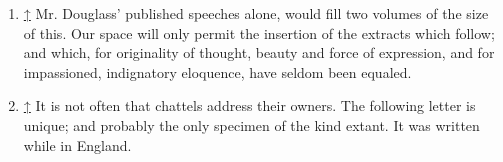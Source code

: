 \begin{enumerate}
\item
  \hypertarget{cite_note-1}{}

  {\protect\hyperlink{cite_ref-1}{↑}} {Mr. Douglass' published speeches
  alone, would fill two volumes of the size of this. Our space will only
  permit the insertion of the extracts which follow; and which, for
  originality of thought, beauty and force of expression, and for
  impassioned, indignatory eloquence, have seldom been equaled.}
\item
  \hypertarget{cite_note-2}{}

  {\protect\hyperlink{cite_ref-2}{↑}} {It is not often that chattels
  address their owners. The following letter is unique; and probably the
  only specimen of the kind extant. It was written while in England.}
\end{enumerate}
